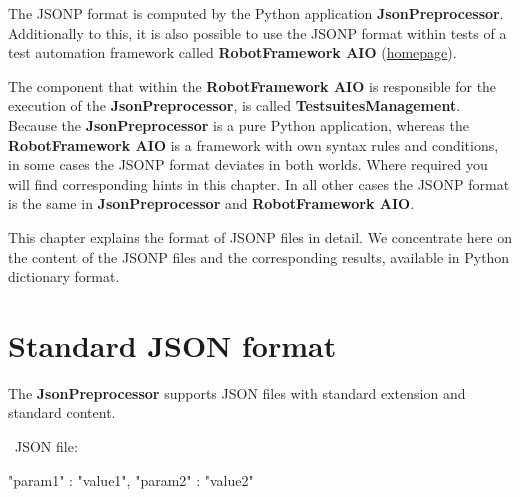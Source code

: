 




\label{thejsonpformat}

The JSONP format is computed by the Python application \textbf{JsonPreprocessor}. Additionally to this, it is also possible to use the JSONP format
within tests of a test automation framework called \textbf{RobotFramework AIO} (\href{https://robotframework-aio.org/}{homepage}).

The component that within the \textbf{RobotFramework AIO} is responsible for the execution of the \textbf{JsonPreprocessor}, is called
\textbf{TestsuitesManagement}. Because the \textbf{JsonPreprocessor} is a pure Python application, whereas the \textbf{RobotFramework AIO}
is a framework with own syntax rules and conditions, in some cases the JSONP format deviates in both worlds. Where required you will find corresponding
hints in this chapter. In all other cases the JSONP format is the same in \textbf{JsonPreprocessor} and \textbf{RobotFramework AIO}.

This chapter explains the format of JSONP files in detail. We concentrate here on the content of the JSONP files and the corresponding results,
available in Python dictionary format. 

\section{Standard JSON format}

The \textbf{JsonPreprocessor} supports JSON files with standard extension  and standard content.

\textbullet\ JSON file:

\begin{pythoncode}
{
   "param1" : "value1",
   "param2" : "value2"
}
\end{pythoncode}

